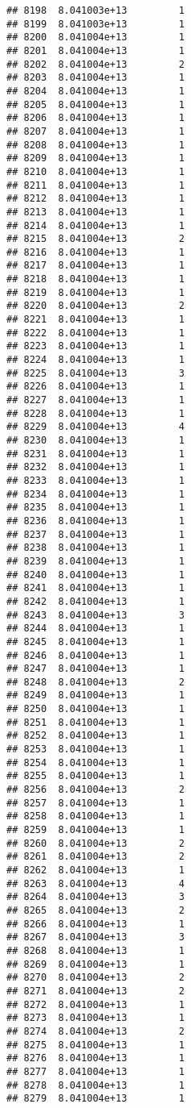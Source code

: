 \documentclass[
]{article}
\begin{document}
\begin{verbatim}
## 8198  8.041003e+13         1
## 8199  8.041003e+13         1
## 8200  8.041004e+13         1
## 8201  8.041004e+13         1
## 8202  8.041004e+13         2
## 8203  8.041004e+13         1
## 8204  8.041004e+13         1
## 8205  8.041004e+13         1
## 8206  8.041004e+13         1
## 8207  8.041004e+13         1
## 8208  8.041004e+13         1
## 8209  8.041004e+13         1
## 8210  8.041004e+13         1
## 8211  8.041004e+13         1
## 8212  8.041004e+13         1
## 8213  8.041004e+13         1
## 8214  8.041004e+13         1
## 8215  8.041004e+13         2
## 8216  8.041004e+13         1
## 8217  8.041004e+13         1
## 8218  8.041004e+13         1
## 8219  8.041004e+13         1
## 8220  8.041004e+13         2
## 8221  8.041004e+13         1
## 8222  8.041004e+13         1
## 8223  8.041004e+13         1
## 8224  8.041004e+13         1
## 8225  8.041004e+13         3
## 8226  8.041004e+13         1
## 8227  8.041004e+13         1
## 8228  8.041004e+13         1
## 8229  8.041004e+13         4
## 8230  8.041004e+13         1
## 8231  8.041004e+13         1
## 8232  8.041004e+13         1
## 8233  8.041004e+13         1
## 8234  8.041004e+13         1
## 8235  8.041004e+13         1
## 8236  8.041004e+13         1
## 8237  8.041004e+13         1
## 8238  8.041004e+13         1
## 8239  8.041004e+13         1
## 8240  8.041004e+13         1
## 8241  8.041004e+13         1
## 8242  8.041004e+13         1
## 8243  8.041004e+13         3
## 8244  8.041004e+13         1
## 8245  8.041004e+13         1
## 8246  8.041004e+13         1
## 8247  8.041004e+13         1
## 8248  8.041004e+13         2
## 8249  8.041004e+13         1
## 8250  8.041004e+13         1
## 8251  8.041004e+13         1
## 8252  8.041004e+13         1
## 8253  8.041004e+13         1
## 8254  8.041004e+13         1
## 8255  8.041004e+13         1
## 8256  8.041004e+13         2
## 8257  8.041004e+13         1
## 8258  8.041004e+13         1
## 8259  8.041004e+13         1
## 8260  8.041004e+13         2
## 8261  8.041004e+13         2
## 8262  8.041004e+13         1
## 8263  8.041004e+13         4
## 8264  8.041004e+13         3
## 8265  8.041004e+13         2
## 8266  8.041004e+13         1
## 8267  8.041004e+13         3
## 8268  8.041004e+13         1
## 8269  8.041004e+13         1
## 8270  8.041004e+13         2
## 8271  8.041004e+13         2
## 8272  8.041004e+13         1
## 8273  8.041004e+13         1
## 8274  8.041004e+13         2
## 8275  8.041004e+13         1
## 8276  8.041004e+13         1
## 8277  8.041004e+13         1
## 8278  8.041004e+13         1
## 8279  8.041004e+13         1

\end{verbatim}
\end{document}
